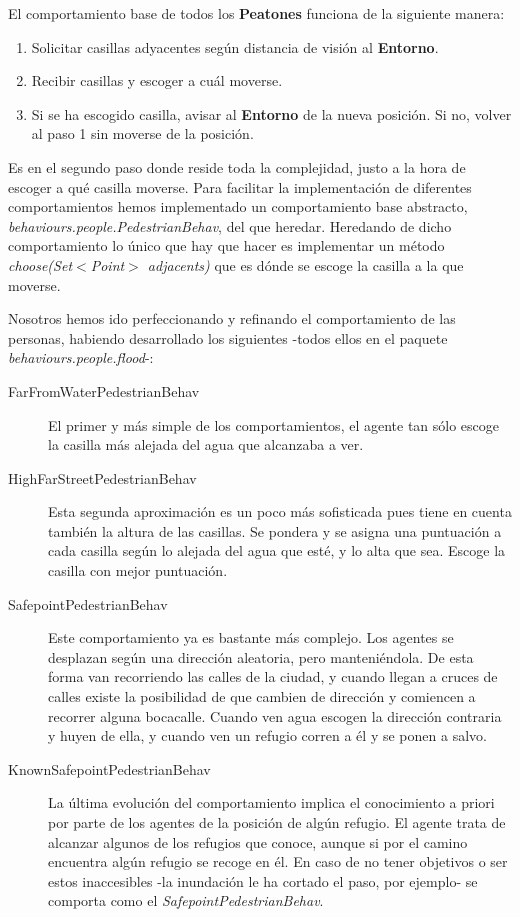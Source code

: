 El comportamiento base de todos los {\bf Peatones} funciona de la siguiente
manera:

\begin{enumerate}
 \item Solicitar casillas adyacentes según distancia de visión al {\bf Entorno}.
 \item Recibir casillas y escoger a cuál moverse.
 \item Si se ha escogido casilla, avisar al {\bf Entorno} de la nueva posición.
 Si no, volver al paso 1 sin moverse de la posición.
\end{enumerate}

Es en el segundo paso donde reside toda la complejidad, justo a la hora de
escoger a qué casilla moverse. Para facilitar la implementación de diferentes
comportamientos hemos implementado un comportamiento base abstracto, {\em
behaviours.people.PedestrianBehav}, del que heredar. Heredando de dicho
comportamiento lo único que hay que hacer es implementar un método {\em
choose(Set$<$Point$>$ adjacents)} que es dónde se escoge la casilla a la que
moverse.

Nosotros hemos ido perfeccionando y refinando el comportamiento de las
personas, habiendo desarrollado los siguientes -todos ellos en el paquete {\em
behaviours.people.flood}-:

\begin{description}
 \item[FarFromWaterPedestrianBehav] El primer y más simple de los
 comportamientos, el agente tan sólo escoge la casilla más alejada del agua
 que alcanzaba a ver.
 \item[HighFarStreetPedestrianBehav] Esta segunda aproximación es un poco más
 sofisticada pues tiene en cuenta también la altura de las casillas. Se pondera
 y se asigna una puntuación a cada casilla según lo alejada del agua que esté,
 y lo alta que sea. Escoge la casilla con mejor puntuación.
 \item[SafepointPedestrianBehav] Este comportamiento ya es bastante más
 complejo. Los agentes se desplazan según una dirección aleatoria, pero
 manteniéndola. De esta forma van recorriendo las calles de la ciudad, y
 cuando llegan a cruces de calles existe la posibilidad de que cambien de
 dirección y comiencen a recorrer alguna bocacalle. Cuando ven agua escogen la
 dirección contraria y huyen de ella, y cuando ven un refugio corren a él y se
 ponen a salvo.
 \item[KnownSafepointPedestrianBehav] La última evolución del comportamiento
 implica el conocimiento a priori por parte de los agentes de la posición de
 algún refugio. El agente trata de alcanzar algunos de los refugios que conoce,
 aunque si por el camino encuentra algún refugio se recoge en él. En caso de no
 tener objetivos o ser estos inaccesibles -la inundación le ha cortado el paso,
 por ejemplo- se comporta como el {\em SafepointPedestrianBehav}.
\end{description}

